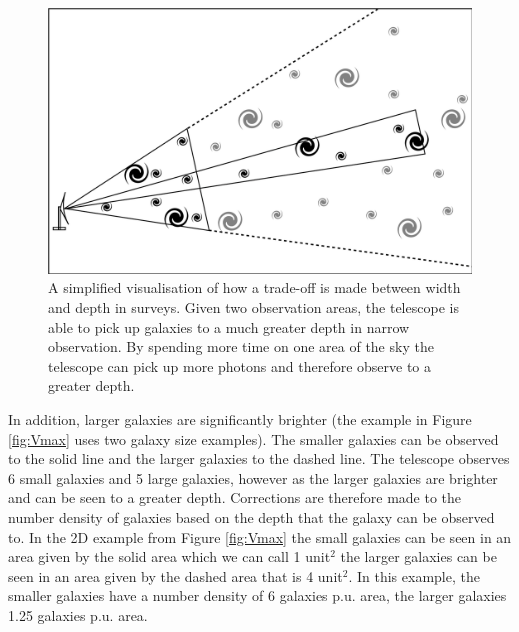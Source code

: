 \begin{figure}[h]
    \centering
    \includegraphics[width = \linewidth]{Figures/Chapter1/W_v_D_Toon.png}
    \caption{A simplified visualisation of how a trade-off is made between width and depth in surveys. Given two observation areas, the telescope is able to pick up galaxies to a much greater depth in narrow observation. By spending more time on one area of the sky the telescope can pick up more photons and therefore observe to a greater depth.}
    \label{fig:WvD}
\end{figure}

In addition, larger galaxies are significantly brighter (the example in Figure \ref{fig:Vmax} uses two galaxy size examples). The smaller galaxies can be observed to the solid line and the larger galaxies to the dashed line. The telescope observes 6 small galaxies and 5 large galaxies, however as the larger galaxies are brighter and can be seen to a greater depth. Corrections are therefore made to the number density of galaxies based on the depth that the galaxy can be observed to. In the 2D example from Figure \ref{fig:Vmax} the small galaxies can be seen in an area given by the solid area which we can call 1 unit$^2$ the larger galaxies can be seen in an area given by the dashed area that is 4 unit$^2$. In this example, the smaller galaxies have a number density of 6 galaxies p.u. area, the larger galaxies 1.25 galaxies p.u. area.

